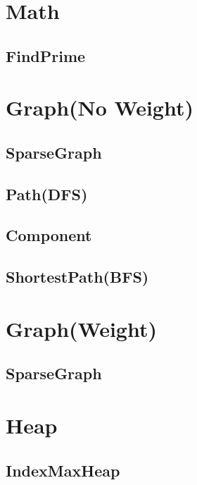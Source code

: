 \section{Math}
    \subsection{FindPrime}
        

\section{Graph(No Weight)}
    \subsection{SparseGraph}
        
    \subsection{Path(DFS)}
        
    \subsection{Component}
        
    \subsection{ShortestPath(BFS)}
        

\section{Graph(Weight)}
    \subsection{SparseGraph}
        
        

\section{Heap}
    \subsection{IndexMaxHeap}
        